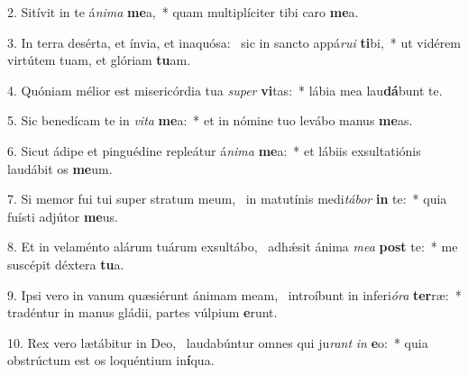 2. Sitívit in te á\textit{ni}\textit{ma} \textbf{me}a,~*  quam multiplíciter tibi caro \textbf{me}a.\

3. In terra desérta, et ínvia, et inaquósa: \dag\  sic in sancto appá\textit{ru}\textit{i} \textbf{ti}bi,~*  ut vidérem virtútem tuam, et glóriam \textbf{tu}am.\

4. Quóniam mélior est misericórdia tua \textit{su}\textit{per} \textbf{vi}tas:~*  lábia mea lau\textbf{dá}bunt te.\

5. Sic benedícam te in \textit{vi}\textit{ta} \textbf{me}a:~*  et in nómine tuo levábo manus \textbf{me}as.\

6. Sicut ádipe et pinguédine repleátur á\textit{ni}\textit{ma} \textbf{me}a:~*  et lábiis exsultatiónis laudábit os \textbf{me}um.\

7. Si memor fui tui super stratum meum, \dag\  in matutínis medi\textit{tá}\textit{bor} \textbf{in} te:~*  quia fuísti adjútor \textbf{me}us.\

8. Et in velaménto alárum tuárum exsultábo, \dag\  adhǽsit ánima \textit{me}\textit{a} \textbf{post} te:~*  me suscépit déxtera \textbf{tu}a.\

9. Ipsi vero in vanum quæsiérunt ánimam meam, \dag\  introíbunt in inferi\textit{ó}\textit{ra} \textbf{ter}ræ:~*  tradéntur in manus gládii, partes vúlpium \textbf{e}runt.\

10. Rex vero lætábitur in Deo, \dag\  laudabúntur omnes qui ju\textit{rant} \textit{in} \textbf{e}o:~*  quia obstrúctum est os loquéntium in\textbf{í}qua.\

